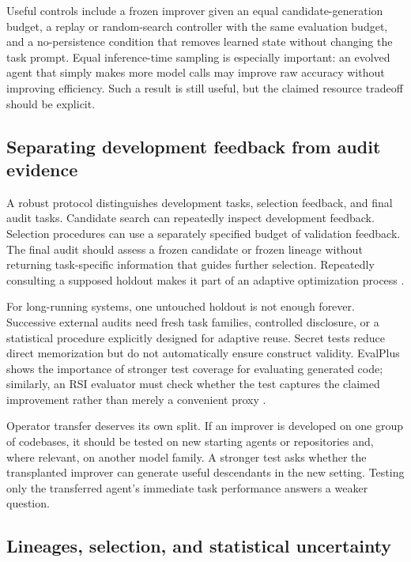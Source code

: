 \documentclass[11pt,american,]{article}
\begin{document}
Useful controls include a frozen improver given an equal
candidate-generation budget, a replay or random-search controller with
the same evaluation budget, and a no-persistence condition that removes
learned state without changing the task prompt. Equal inference-time
sampling is especially important: an evolved agent that simply makes
more model calls may improve raw accuracy without improving efficiency.
Such a result is still useful, but the claimed resource tradeoff should
be explicit.

\hypertarget{separating-development-feedback-from-audit-evidence}{%
\subsection{Separating development feedback from audit
evidence}\label{separating-development-feedback-from-audit-evidence}}

A robust protocol distinguishes development tasks, selection feedback,
and final audit tasks. Candidate search can repeatedly inspect
development feedback. Selection procedures can use a separately
specified budget of validation feedback. The final audit should assess a
frozen candidate or frozen lineage without returning task-specific
information that guides further selection. Repeatedly consulting a
supposed holdout makes it part of an adaptive optimization process
\citep{adaptive2015}.

For long-running systems, one untouched holdout is not enough forever.
Successive external audits need fresh task families, controlled
disclosure, or a statistical procedure explicitly designed for adaptive
reuse. Secret tests reduce direct memorization but do not automatically
ensure construct validity. EvalPlus shows the importance of stronger
test coverage for evaluating generated code; similarly, an RSI evaluator
must check whether the test captures the claimed improvement rather than
merely a convenient proxy \citep{evalplus2023}.

Operator transfer deserves its own split. If an improver is developed on
one group of codebases, it should be tested on new starting agents or
repositories and, where relevant, on another model family. A stronger
test asks whether the transplanted improver can generate useful
descendants in the new setting. Testing only the transferred agent's
immediate task performance answers a weaker question.

\hypertarget{lineages-selection-and-statistical-uncertainty}{%
\subsection{Lineages, selection, and statistical
uncertainty}\label{lineages-selection-and-statistical-uncertainty}}
\end{document}
